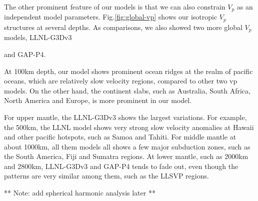 \documentclass[extra,mreferee]{gji}
\begin{document}
{%

The other prominent feature of our models is that we can also constrain $V_p$ as an
independent model parameters. Fig.\ref{fig:global-vp} shows our isotropic $V_p$
structures at several depths. As comparisons, we also showed two more global
$V_p$ models, LLNL-G3Dv3\citep{simmons2012llnl}} and GAP-P4\citep{fukao2013subducted}.

At 100km depth, our model shows prominent ocean ridges at the realm of pacific
oceans, which are relatively slow velocity regions, compared to other two vp models.
On the other hand, the continent slabs, such as Australia, South Africa,
North America and Europe, is more prominent in our model.

For upper mantle, the LLNL-G3Dv3 shows the largest variations. For example,
the 500km, the LLNL model shows very strong slow velocity anomalies at
Hawaii and other pacific hotspots, such as Samoa and Tahiti.
For middle mantle at about 1000km, all them models all shows a few major
subduction zones, such as the South America, Fiji and Sumatra regions.
At lower mantle, such as 2000km and 2800km, LLNL-G3Dv3 and GAP-P4 tends to
fade out, even though the patterns are very similar among them, such as
the LLSVP regions.

** Note: add spherical harmonic analysis later **
\end{document}
